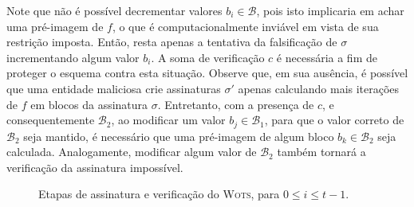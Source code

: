 \documentclass{ufsctex/ufsctex}
\newcommand{\wots}{\textsc{Wots}}
\begin{document}
Note que não é possível decrementar valores $b_i \in \mathcal{B}$, pois isto
implicaria em achar uma pré-imagem de $f$, o que é computacionalmente inviável
em vista de sua restrição imposta. Então, resta apenas a tentativa da
falsificação de $\sigma$ incrementando algum valor $b_i$. A soma de verificação
$c$ é necessária a fim de proteger o esquema contra esta situação. Observe que,
em sua ausência, é possível que uma entidade maliciosa crie assinaturas
$\sigma'$ apenas calculando mais iterações de $f$ em blocos da assinatura
$\sigma$. Entretanto, com a presença de $c$, e consequentemente
$\mathcal{B}_2$, ao modificar um valor $b_j \in \mathcal{B}_1$, para que o
valor correto de $\mathcal{B}_2$ seja mantido, é necessário que uma pré-imagem
de algum bloco $b_k \in \mathcal{B}_2$ seja calculada. Analogamente, modificar
algum valor de $\mathcal{B}_2$ também tornará a verificação da assinatura
impossível.

\begin{figure}
  \centering
  \caption{Etapas de assinatura e verificação do \wots{},
    para $0 \leq i \leq t - 1$.}\label{fig:5}
\end{figure}
\end{document}
